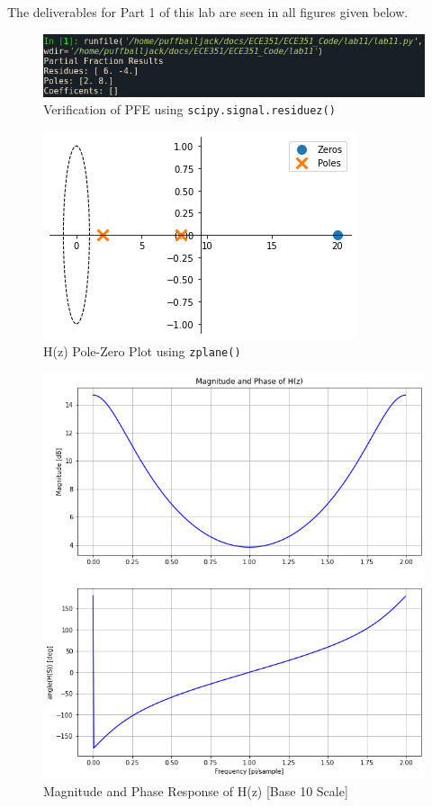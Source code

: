 \documentclass[12pt]{report}
\begin{document}
The deliverables for Part 1 of this lab are seen in all figures given below.
\\
\begin{figure}[h!]
  \centering
  \includegraphics[width=\linewidth]{t3.png}
  \caption{Verification of PFE using \texttt{scipy.signal.residuez()}}
  \label{fig: t3}
\end{figure}
\begin{figure}[h!]
  \centering
  \includegraphics[width=\linewidth]{t4.png}
  \caption{H(z) Pole-Zero Plot using \texttt{zplane()}}
  \label{fig: t4}
\end{figure}
\begin{figure}[h!]
  \centering
  \includegraphics[width=\linewidth]{t5ns.png}
  \caption{Magnitude and Phase Response of H(z) [Base 10 Scale]}
  \label{fig: t5ns}
\end{figure}
\end{document}
